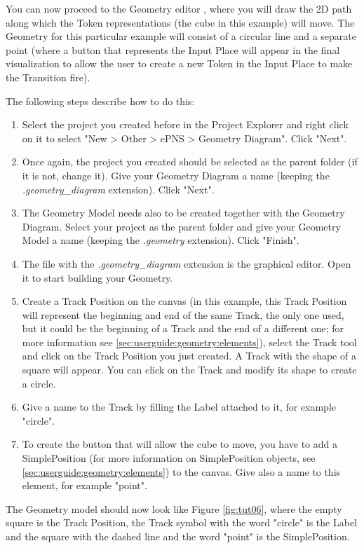 You can now proceed to the Geometry editor , where you will draw the 2D path along which the 
Token representations (the cube in this example) will move. The Geometry for this particular example will consist of a 
circular line and a separate point (where a button that represents the Input Place will appear in the final visualization
to allow the user to create a new Token in the Input Place to make the Transition fire). 

The following steps describe how to do this:
\begin{enumerate}
  \item Select the project you created before in the Project Explorer and right click on it to select "New > Other > 
  ePNS > Geometry Diagram". Click "Next".
  \item Once again, the project you created should be selected as the parent folder (if it is not, change it). Give 
  your Geometry Diagram a name (keeping the \textit{.geometry\_diagram} extension). Click "Next".
  \item The Geometry Model needs also to be created together with the Geometry Diagram. Select your project as the parent 
  folder and give your Geometry Model a name (keeping the \textit{.geometry} extension). Click "Finish".
  \item The file with the \textit{.geometry\_diagram} extension is the graphical editor. Open it to start building your Geometry.
  \item Create a Track Position on the canvas (in this example, this Track Position will represent the beginning and
  end of the same Track, the only one used, but it could be the beginning of a Track and the end of a different one;
  for more information see \ref{sec:userguide:geometry:elements}), select the Track tool and click on the Track
  Position you just created. A Track with the shape of a square will appear. You can click on the Track and modify
  its shape to create a circle.
  \item Give a name to the Track by filling the Label attached to it, for example "circle".
  \item To create the button that will allow the cube to move, you have to add a SimplePosition (for more information
  on SimplePosition objects, see \ref{sec:userguide:geometry:elements}) to the canvas. Give also a name to this
  element, for example "point".
\end{enumerate}

The Geometry model should now look like Figure \ref{fig:tut06}, where the empty square is the Track Position, the Track
symbol with the word "circle" is the Label and the square with the dashed line and the word "point" is the SimplePosition.

